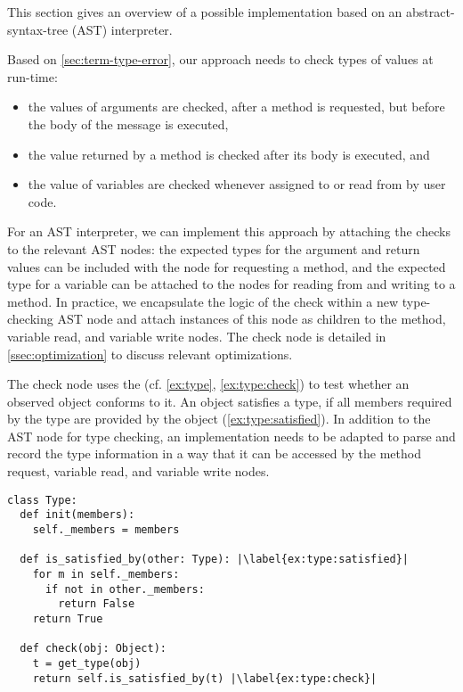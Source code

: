 This section gives an overview of a possible implementation
based on an abstract-syntax-tree (AST) interpreter.

Based on \cref{sec:term-type-error},
our approach needs to check types of values at run-time:

\begin{itemize}
\item the values of arguments are checked, after a method is requested, 
      but before the body of the message is executed,
\item the value returned by a method is checked after its body is executed, and
\item the value of variables are checked
      whenever assigned to or read from by user code.
\end{itemize}

For an AST interpreter,
we can implement this approach by attaching the checks to the relevant AST nodes:
the expected types for the argument and return values can be included
with the node for requesting a method, and the expected type for a variable
can be attached to the nodes for reading from and writing to a method.
In practice,
we encapsulate the logic of the check within a new type-checking AST node
and attach instances of this node as children to the method,
variable read, and variable write nodes. 
The check node is detailed in \cref{ssec:optimization} to discuss relevant
optimizations.

The check node uses the  (cf. \cref{ex:type}, \cref{ex:type:check}) to test whether an observed
object conforms to it.
An object satisfies a type, if all members required by the type are provided
by the object (\cref{ex:type:satisfied}).
In addition to the AST node for type checking,
an implementation needs to be adapted to parse and record
the type information in a way that it can be accessed by the
method request, variable read, and variable write nodes.


\begin{lstlisting}[label={ex:type},escapechar=|,caption={Sketch of a \code{Type} in our system and its \code{check()} semantics.},float,floatplacement=htb]
class Type:
  def init(members):
    self._members = members

  def is_satisfied_by(other: Type): |\label{ex:type:satisfied}|
    for m in self._members:
      if not in other._members:
        return False
    return True

  def check(obj: Object):
    t = get_type(obj)
    return self.is_satisfied_by(t) |\label{ex:type:check}|
\end{lstlisting}


